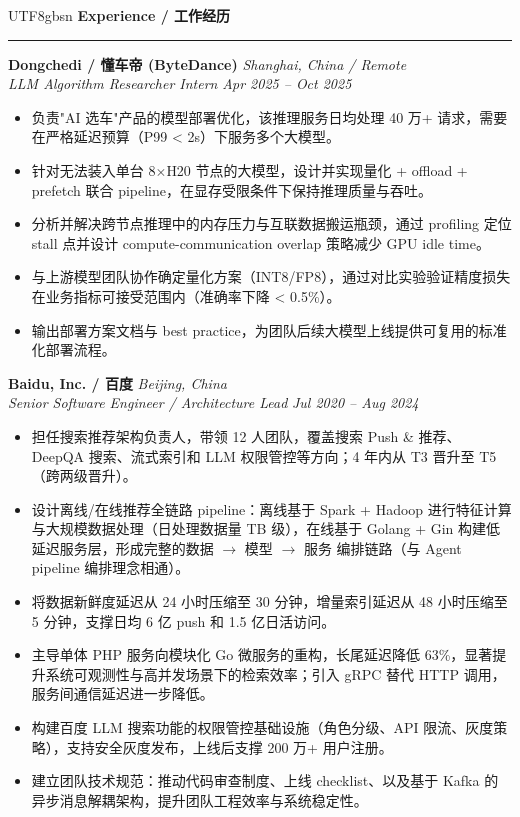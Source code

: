 \documentclass[]{resume}
\renewenvironment{rSection}[1]{%
  \vspace{0.5em}%
  \textbf{#1}%
  \vspace{0.16em}%
  \hrule
  \vspace{0.25em}%
  \begin{list}{}{%
    \setlength{\leftmargin}{0.85em}%
    \setlength{\rightmargin}{0em}%
    \setlength{\itemsep}{0pt}%
    \setlength{\topsep}{0pt}%
    \setlength{\parsep}{0pt}%
    \setlength{\partopsep}{0pt}%
  }%
  \item[]%
}{%
  \end{list}%
  \vspace{-0.28em}%
}
\newcommand{\entryspace}{\vspace{1.5ex}}
\begin{document}
\begin{CJK}{UTF8}{gbsn}
\begin{rSection}{Experience / 工作经历}
\entryspace
\textbf{Dongchedi / 懂车帝 (ByteDance)} \hfill \textit{Shanghai, China / Remote}\\
\textit{LLM Algorithm Researcher Intern} \hfill \textit{Apr 2025 -- Oct 2025}
\begin{itemize}
    \item 负责"AI 选车"产品的模型部署优化，该推理服务日均处理 40 万+ 请求，需要在严格延迟预算（P99 < 2s）下服务多个大模型。
    \item 针对无法装入单台 8$\times$H20 节点的大模型，设计并实现量化 + offload + prefetch 联合 pipeline，在显存受限条件下保持推理质量与吞吐。
    \item 分析并解决跨节点推理中的内存压力与互联数据搬运瓶颈，通过 profiling 定位 stall 点并设计 compute-communication overlap 策略减少 GPU idle time。
    \item 与上游模型团队协作确定量化方案（INT8/FP8），通过对比实验验证精度损失在业务指标可接受范围内（准确率下降 < 0.5\%）。
    \item 输出部署方案文档与 best practice，为团队后续大模型上线提供可复用的标准化部署流程。
\end{itemize}

\entryspace
\textbf{Baidu, Inc. / 百度} \hfill \textit{Beijing, China}\\
\textit{Senior Software Engineer / Architecture Lead} \hfill \textit{Jul 2020 -- Aug 2024}
\begin{itemize}
    \item 担任搜索推荐架构负责人，带领 12 人团队，覆盖搜索 Push \& 推荐、DeepQA 搜索、流式索引和 LLM 权限管控等方向；4 年内从 T3 晋升至 T5（跨两级晋升）。
    \item 设计离线/在线推荐全链路 pipeline：离线基于 Spark + Hadoop 进行特征计算与大规模数据处理（日处理数据量 TB 级），在线基于 Golang + Gin 构建低延迟服务层，形成完整的数据 $\rightarrow$ 模型 $\rightarrow$ 服务 编排链路（与 Agent pipeline 编排理念相通）。
    \item 将数据新鲜度延迟从 24 小时压缩至 30 分钟，增量索引延迟从 48 小时压缩至 5 分钟，支撑日均 6 亿 push 和 1.5 亿日活访问。
    \item 主导单体 PHP 服务向模块化 Go 微服务的重构，长尾延迟降低 63\%，显著提升系统可观测性与高并发场景下的检索效率；引入 gRPC 替代 HTTP 调用，服务间通信延迟进一步降低。
    \item 构建百度 LLM 搜索功能的权限管控基础设施（角色分级、API 限流、灰度策略），支持安全灰度发布，上线后支撑 200 万+ 用户注册。
    \item 建立团队技术规范：推动代码审查制度、上线 checklist、以及基于 Kafka 的异步消息解耦架构，提升团队工程效率与系统稳定性。
\end{itemize}
\end{rSection}


\end{CJK}
\end{document}
